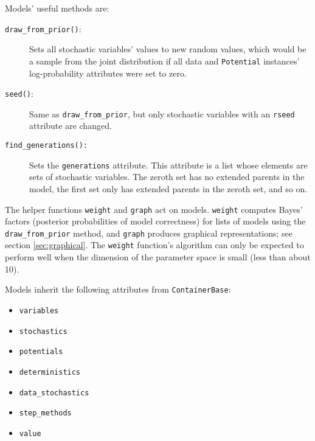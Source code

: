Models' useful methods are:
\begin{description}
    \item[\texttt{draw_from_prior()}:] Sets all stochastic variables' values to new random values, which would be a sample from the joint distribution if all data and \texttt{Potential} instances' log-probability attributes were set to zero.
    \item[\texttt{seed()}:] Same as \texttt{draw_from_prior}, but only stochastic variables with an \texttt{rseed} attribute are changed.
    \item[\texttt{find_generations():}] Sets the \texttt{generations} attribute. This attribute is a list whose elements are sets of stochastic variables. The zeroth set has no extended parents in the model, the first set only has extended parents in the zeroth set, and so on.
\end{description}

The helper functions \texttt{weight} and \texttt{graph} act on models. \texttt{weight} computes Bayes' factors (posterior probabilities of model correctness) for lists of models using the \texttt{draw_from_prior} method, and \texttt{graph} produces graphical representations; see section \ref{sec:graphical}. The \texttt{weight} function's algorithm can only be expected to perform well when the dimension of the parameter space is small (less than about 10).

Models inherit the following attributes from \texttt{ContainerBase}:
\begin{itemize}
    \item \texttt{variables}
    \item \texttt{stochastics}
    \item \texttt{potentials}
    \item \texttt{deterministics}
    \item \texttt{data_stochastics}
    \item \texttt{step_methods}
    \item \texttt{value}
\end{itemize}



